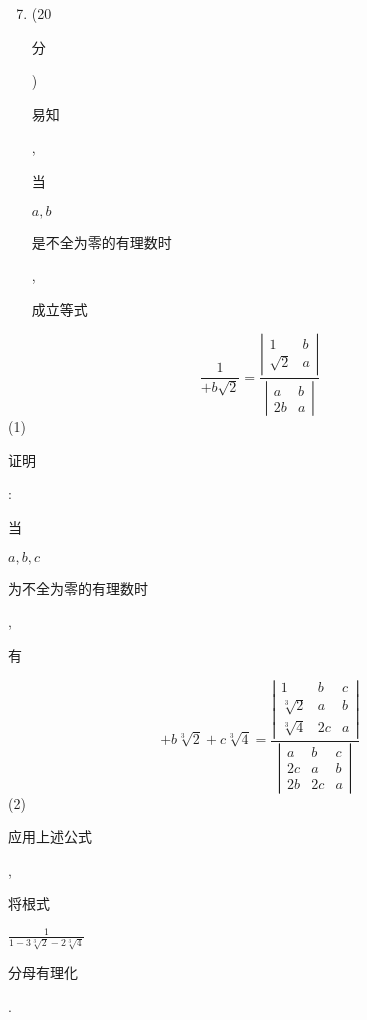 \documentclass[10pt]{article}
\begin{document}
\begin{enumerate}
  \setcounter{enumi}{6}
  \item (20 \begin{CJK}{UTF8}{mj}分\end{CJK}) \begin{CJK}{UTF8}{mj}易知\end{CJK}, \begin{CJK}{UTF8}{mj}当\end{CJK} $a, b$ \begin{CJK}{UTF8}{mj}是不全为零的有理数时\end{CJK}, \begin{CJK}{UTF8}{mj}成立等式\end{CJK}
\end{enumerate}
$$
\frac{1}{+b \sqrt{2}}=\frac{\left|\begin{array}{cc}
1 & b \\
\sqrt{2} & a
\end{array}\right|}{\left|\begin{array}{cc}
a & b \\
2 b & a
\end{array}\right|}
$$
(1) \begin{CJK}{UTF8}{mj}证明\end{CJK}: \begin{CJK}{UTF8}{mj}当\end{CJK} $a, b, c$ \begin{CJK}{UTF8}{mj}为不全为零的有理数时\end{CJK}, \begin{CJK}{UTF8}{mj}有\end{CJK}
$$
+b \sqrt[3]{2}+c \sqrt[3]{4}=\frac{\left|\begin{array}{ccc}
1 & b & c \\
\sqrt[3]{2} & a & b \\
\sqrt[3]{4} & 2 c & a
\end{array}\right|}{\left|\begin{array}{ccc}
a & b & c \\
2 c & a & b \\
2 b & 2 c & a
\end{array}\right|}
$$
(2)\begin{CJK}{UTF8}{mj}应用上述公式\end{CJK}, \begin{CJK}{UTF8}{mj}将根式\end{CJK} $\frac{1}{1-3 \sqrt[3]{2}-2 \sqrt[3]{4}}$ \begin{CJK}{UTF8}{mj}分母有理化\end{CJK}.
\end{document}
